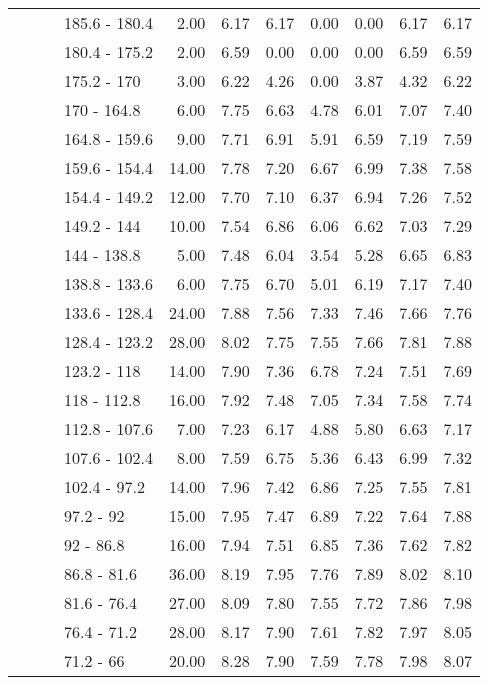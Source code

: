 \begin{longtable}{llllrrrrrrr}
   &  &  & 185.6 - 180.4 & 2.00 & 6.17 & 6.17 & 0.00 & 0.00 & 6.17 & 6.17 \\ 
   &  &  & 180.4 - 175.2 & 2.00 & 6.59 & 0.00 & 0.00 & 0.00 & 6.59 & 6.59 \\ 
   &  &  & 175.2 - 170 & 3.00 & 6.22 & 4.26 & 0.00 & 3.87 & 4.32 & 6.22 \\ 
   &  &  & 170 - 164.8 & 6.00 & 7.75 & 6.63 & 4.78 & 6.01 & 7.07 & 7.40 \\ 
   &  &  & 164.8 - 159.6 & 9.00 & 7.71 & 6.91 & 5.91 & 6.59 & 7.19 & 7.59 \\ 
   &  &  & 159.6 - 154.4 & 14.00 & 7.78 & 7.20 & 6.67 & 6.99 & 7.38 & 7.58 \\ 
   &  &  & 154.4 - 149.2 & 12.00 & 7.70 & 7.10 & 6.37 & 6.94 & 7.26 & 7.52 \\ 
   &  &  & 149.2 - 144 & 10.00 & 7.54 & 6.86 & 6.06 & 6.62 & 7.03 & 7.29 \\ 
   &  &  & 144 - 138.8 & 5.00 & 7.48 & 6.04 & 3.54 & 5.28 & 6.65 & 6.83 \\ 
   &  &  & 138.8 - 133.6 & 6.00 & 7.75 & 6.70 & 5.01 & 6.19 & 7.17 & 7.40 \\ 
   &  &  & 133.6 - 128.4 & 24.00 & 7.88 & 7.56 & 7.33 & 7.46 & 7.66 & 7.76 \\ 
   &  &  & 128.4 - 123.2 & 28.00 & 8.02 & 7.75 & 7.55 & 7.66 & 7.81 & 7.88 \\ 
   &  &  & 123.2 - 118 & 14.00 & 7.90 & 7.36 & 6.78 & 7.24 & 7.51 & 7.69 \\ 
   &  &  & 118 - 112.8 & 16.00 & 7.92 & 7.48 & 7.05 & 7.34 & 7.58 & 7.74 \\ 
   &  &  & 112.8 - 107.6 & 7.00 & 7.23 & 6.17 & 4.88 & 5.80 & 6.63 & 7.17 \\ 
   &  &  & 107.6 - 102.4 & 8.00 & 7.59 & 6.75 & 5.36 & 6.43 & 6.99 & 7.32 \\ 
   &  &  & 102.4 - 97.2 & 14.00 & 7.96 & 7.42 & 6.86 & 7.25 & 7.55 & 7.81 \\ 
   &  &  & 97.2 - 92 & 15.00 & 7.95 & 7.47 & 6.89 & 7.22 & 7.64 & 7.88 \\ 
   &  &  & 92 - 86.8 & 16.00 & 7.94 & 7.51 & 6.85 & 7.36 & 7.62 & 7.82 \\ 
   &  &  & 86.8 - 81.6 & 36.00 & 8.19 & 7.95 & 7.76 & 7.89 & 8.02 & 8.10 \\ 
   &  &  & 81.6 - 76.4 & 27.00 & 8.09 & 7.80 & 7.55 & 7.72 & 7.86 & 7.98 \\ 
   &  &  & 76.4 - 71.2 & 28.00 & 8.17 & 7.90 & 7.61 & 7.82 & 7.97 & 8.05 \\ 
   &  &  & 71.2 - 66 & 20.00 & 8.28 & 7.90 & 7.59 & 7.78 & 7.98 & 8.07 \\ 

\end{longtable}
